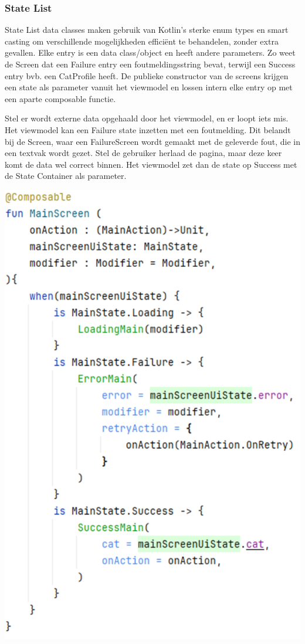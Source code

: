 \documentclass{report}
\begin{document}
\subsubsection{State List}
State List data classes maken gebruik van Kotlin's sterke enum types en smart casting om verschillende mogelijkheden efficiënt te behandelen, zonder extra gevallen.
Elke entry is een data class/object en heeft andere parameters. Zo weet de Screen dat een Failure entry een foutmeldingsstring bevat, terwijl een Success entry bvb. een CatProfile heeft.
De publieke constructor van de screens krijgen een state als parameter vanuit het viewmodel en lossen intern elke entry op met een aparte composable functie.

Stel er wordt externe data opgehaald door het viewmodel, en er loopt iets mis. Het viewmodel kan een Failure state inzetten met een foutmelding.
Dit belandt bij de Screen, waar een FailureScreen wordt gemaakt met de geleverde fout, die in een textvak wordt gezet.
Stel de gebruiker herlaad de pagina, maar deze keer komt de data wel correct binnen. Het viewmodel zet dan de state op Success met de State Container als parameter.
\begin{center}
    \includegraphics{MVVM_ScreenState}
\end{center}
\end{document}
